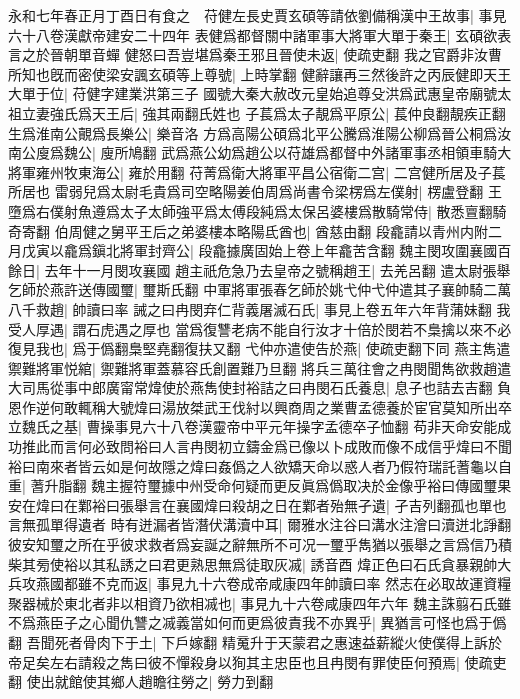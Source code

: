 永和七年春正月丁酉日有食之　苻健左長史賈玄碩等請依劉備稱漢中王故事|{
	事見六十八卷漢獻帝建安二十四年}
表健爲都督關中諸軍事大將軍大單于秦王|{
	玄碩欲表言之於晉朝單音蟬}
健怒曰吾豈堪爲秦王邪且晉使未返|{
	使疏吏翻}
我之官爵非汝曹所知也旣而密使梁安諷玄碩等上尊號|{
	上時掌翻}
健辭讓再三然後許之丙辰健即天王大單于位|{
	苻健字建業洪第三子}
國號大秦大赦改元皇始追尊殳洪爲武惠皇帝廟號太祖立妻強氏爲天王后|{
	強其兩翻氏姓也}
子萇爲太子靚爲平原公|{
	萇仲良翻靚疾正翻}
生爲淮南公覿爲長樂公|{
	樂音洛}
方爲高陽公碩爲北平公騰爲淮陽公柳爲晉公桐爲汝南公廋爲魏公|{
	廋所鳩翻}
武爲燕公幼爲趙公以苻雄爲都督中外諸軍事丞相領車騎大將軍雍州牧東海公|{
	雍於用翻}
苻菁爲衛大將軍平昌公宿衛二宫|{
	二宫健所居及子萇所居也}
雷弱兒爲太尉毛貴爲司空略陽姜伯周爲尚書令梁楞爲左僕射|{
	楞盧登翻}
王墮爲右僕射魚遵爲太子太師強平爲太傅段純爲太保呂婆樓爲散騎常侍|{
	散悉亶翻騎奇寄翻}
伯周健之舅平王后之弟婆樓本略陽氐酋也|{
	酋慈由翻}
段龕請以青州内附二月戊寅以龕爲鎭北將軍封齊公|{
	段龕據廣固始上卷上年龕苦含翻}
魏主閔攻圍襄國百餘日|{
	去年十一月閔攻襄國}
趙主祇危急乃去皇帝之號稱趙王|{
	去羌呂翻}
遣太尉張舉乞師於燕許送傳國璽|{
	璽斯氏翻}
中軍將軍張春乞師於姚弋仲弋仲遣其子襄帥騎二萬八千救趙|{
	帥讀曰率}
誡之曰冉閔弃仁背義屠滅石氏|{
	事見上卷五年六年背蒲妹翻}
我受人厚遇|{
	謂石虎遇之厚也}
當爲復讐老病不能自行汝才十倍於閔若不梟擒以來不必復見我也|{
	爲于僞翻梟堅堯翻復扶又翻}
弋仲亦遣使告於燕|{
	使疏吏翻下同}
燕主雋遣禦難將軍悦綰|{
	禦難將軍蓋慕容氏創置難乃旦翻}
將兵三萬往會之冉閔聞雋欲救趙遣大司馬從事中郎廣甯常煒使於燕雋使封裕詰之曰冉閔石氏養息|{
	息子也詰去吉翻}
負恩作逆何敢輒稱大號煒曰湯放桀武王伐紂以興商周之業曹孟德養於宦官莫知所出卒立魏氏之基|{
	曹操事見六十八卷漢靈帝中平元年操字孟德卒子恤翻}
苟非天命安能成功推此而言何必致問裕曰人言冉閔初立鑄金爲已像以卜成敗而像不成信乎煒曰不聞裕曰南來者皆云如是何故隱之煒曰姦僞之人欲矯天命以惑人者乃假符瑞託蓍龜以自重|{
	蓍升脂翻}
魏主握符璽據中州受命何疑而更反眞爲僞取决於金像乎裕曰傳國璽果安在煒曰在鄴裕曰張舉言在襄國煒曰殺胡之日在鄴者殆無孑遺|{
	孑吉列翻孤也單也言無孤單得遺者}
時有迸漏者皆潛伏溝瀆中耳|{
	爾雅水注谷曰溝水注澮曰瀆迸北諍翻}
彼安知璽之所在乎彼求救者爲妄誕之辭無所不可况一璽乎雋猶以張舉之言爲信乃積柴其㫄使裕以其私誘之曰君更熟思無爲徒取灰㓕|{
	誘音酉}
煒正色曰石氏貪暴親帥大兵攻燕國都雖不克而返|{
	事見九十六卷成帝咸康四年帥讀曰率}
然志在必取故運資糧聚器械於東北者非以相資乃欲相㓕也|{
	事見九十六卷咸康四年六年}
魏主誅翦石氏雖不爲燕臣子之心聞仇讐之㓕義當如何而更爲彼責我不亦異乎|{
	異猶言可怪也爲于僞翻}
吾聞死者骨肉下于土|{
	下戶嫁翻}
精䰟升于天蒙君之惠速益薪縱火使僕得上訴於帝足矣左右請殺之雋曰彼不憚殺身以狥其主忠臣也且冉閔有罪使臣何預焉|{
	使疏吏翻}
使出就館使其鄉人趙瞻往勞之|{
	勞力到翻}
